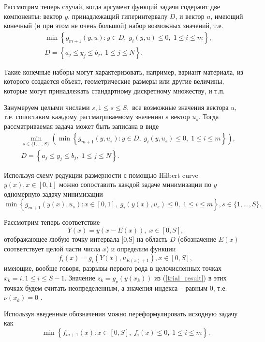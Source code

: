 \documentclass[
11pt,%
tightenlines,%
twoside,%
onecolumn,%
nofloats,%
nobibnotes,%
nofootinbib,%
superscriptaddress,%
noshowpacs,%
centertags]%
{revtex4}
\begin{document}
Рассмотрим теперь случай, когда аргумент функций задачи содержит две компоненты: вектор $y$, принадлежащий гиперинтервалу $D$, и вектор $u$, имеющий конечный (и при этом не очень большой) набор возможных значений, т.е. 
\begin{eqnarray}\label{problem_i}
& \min{\left\{ g_{m+1}(y,u):y\in D, \; g_i(y,u)\leq 0, \; 1 \leq i \leq m\right\}},\\
& D=\left\{a_j\leq y_j \leq b_j, \; 1\leq j \leq N \right\}.\nonumber
\end{eqnarray}

Такие конечные наборы могут характеризовать, например, вариант материала, из которого создается объект, геометрические размеры или другие величины, которые могут принадлежать стандартному дискретному множеству, и т.п.

Занумеруем целыми числами $s, 1\leq s \leq S,$ все возможные значения вектора $u$, т.е. сопоставим каждому рассматриваемому значению $s$ вектор $u_s$. 
Тогда рассматриваемая задача может быть записана в виде 
\begin{eqnarray}\label{problem_is}
& \min_{s\in\{1,...,S\}}\left(\min{\left\{ g_{m+1}(y,u_s):y\in D, \; g_i(y,u_s)\leq 0, \; 1 \leq i \leq m\right\}}\right),\\
& D=\left\{ a_j\leq y_j \leq b_j, \; 1 \leq j\leq N \right\}.\nonumber 
\end{eqnarray}

Используя схему редукции размерности с помощью Hilbert curve $y(x), x\in [0,1]$ можно сопоставить каждой задаче минимизации по $y$ одномерную задачу минимизации
\[
 \min{\left\{ g_{m+1}(y(x),u_s):x \in [0,1], \; g_i(y(x),u_s)\leq 0, \; 1 \leq i \leq m\right\}}, s\in\{1,...,S\}.
\]

Рассмотрим теперь соответствие 
\[
Y(x)=y(x-E(x)), \; x\in[0,S],
\]
отображающее любую точку интервала [0,S] на область $D$ (обозначение $E(x)$ соответствует целой части числа $x$) и определим функции 
\[
f_i(x) = g_i(Y(x),u_{E(x)+1}), x\in[0,S],
\]
имеющие, вообще говоря, разрывы первого рода в целочисленных точках $x_k = i, 1\leq i \leq S-1$.
Значение  $z_k = g_\nu(y(x_k))$ из (\ref{trial_result}) в этих точках будем считать неопределенным, а значения индекса -- равным 0, т.е. $\nu(x_k) = 0$ .

Используя введенные обозначения можно переформулировать исходную задачу как
\begin{equation}\label{problem_is1}
\min \left\{f_{m+1}(x): x \in [0,S], \; f_i(x) \leq 0, \; 1 \leq i \leq m\right\}.
\end{equation}
\end{document}
